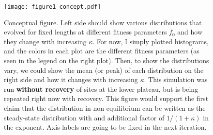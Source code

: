 \documentclass[10pt,a4paper]{article}
\begin{document}
	\begin{figure}
		\texttt{[image: figure1\_concept.pdf]}\caption{\color{ForestGreen} Conceptual figure. Left side should show various distributions that evolved for fixed lengths at different fitness parameters $f_0$ and how they change with increasing $\kappa$. For now, I simply plotted histograms, and the colors in each plot are the different fitness parameters (as seen in the legend on the right plot). Then, to show the distributions vary, we could show the mean (or peak) of each distribution on the right side and how it changes with increasing $\kappa$. This simulation was run \textbf{without recovery} of sites at the lower plateau, but is being repeated right now with recovery. This figure would support the first claim that the distribution in non-equilibrium can be written as the steady-state distribution with and additional factor of $1/(1+\kappa)$ in the exponent. Axis labels are going to be fixed in the next iteration.}\label{fig1}
	\end{figure}
\end{document}
